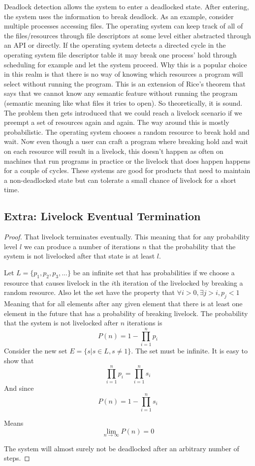 Deadlock detection allows the system to enter a deadlocked state.
After entering, the system uses the information to break deadlock.
As an example, consider multiple processes accessing files.
The operating system can keep track of all of the files/resources through file descriptors at some level either abstracted through an API or directly.
If the operating system detects a directed cycle in the operating system file descriptor table it may break one process' hold through scheduling for example and let the system proceed.
Why this is a popular choice in this realm is that there is no way of knowing which resources a program will select without running the program.
This is an extension of Rice's theorem \cite{rice} that says that we cannot know any semantic feature without running the program (semantic meaning like what files it tries to open).
So theoretically, it is sound.
The problem then gets introduced that we could reach a livelock scenario if we preempt a set of resources again and again.
The way around this is mostly probabilistic.
The operating system chooses a random resource to break hold and wait.
Now even though a user can craft a program where breaking hold and wait on each resource will result in a livelock, this doesn't happen as often on machines that run programs in practice or the livelock that does happen happens for a couple of cycles.
These systems are good for products that need to maintain a non-deadlocked state but can tolerate a small chance of livelock for a short time.

\subsection{Extra: Livelock Eventual Termination}

\begin{proof}
  That livelock terminates eventually.
  This meaning that for any probability level $l$ we can produce a number of iterations $n$ that the probability that the system is not livelocked after that state is at least $l$.

  Let $L = \{p_1, p_2, p_3, ...\}$ be an infinite set that has probabilities if we choose a resource that causes livelock in the $i$th iteration of the livelocked by breaking a random resource.
  Also let the set have the property that $\forall i > 0, \exists j > i, p_j < 1$ Meaning that for all elements after any given element that there is at least one element in the future that has a probability of breaking livelock.
  The probability that the system is not livelocked after $n$ iterations is
\[
P(n) = 1 - \prod\limits_{i = 1}^{n}p_i
\]
Consider the new set $E = \{s|s \in L,s \neq 1\}$.
The set must be infinite.
It is easy to show that
\[
\prod\limits_{i = 1}^{n}p_i = \prod\limits_{i = 1}^{n}s_i
\]
And since
\[
P(n) = 1 - \prod\limits_{i = 1}^{n}s_i
\]

Means
\[
\lim\limits_{n \rightarrow \infty} P(n) = 0
\]

The system will almost surely not be deadlocked after an arbitrary number of steps.

\end{proof}

